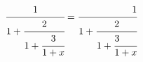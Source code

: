 \[  \cfrac{1}{1+\cfrac{2}{%
      1+\cfrac{3}{1+x}}}  =
    \cfrac[r]{1}{1+\cfrac{2}{%
      1+\cfrac[l]{3}{1+x}}}   \]
